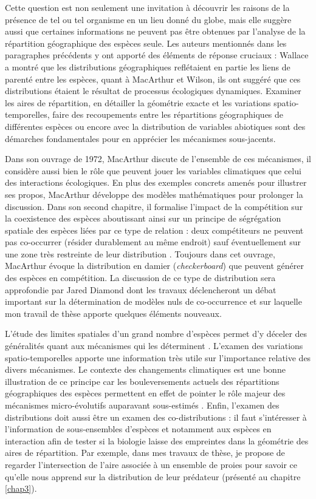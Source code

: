 Cette question est non seulement une invitation à découvrir les raisons
de la présence de tel ou tel organisme en un lieu donné du globe, mais
elle suggère aussi que certaines informations ne peuvent pas être
obtenues par l'analyse de la répartition géographique des espèces seule.
Les auteurs mentionnés dans les paragraphes précédents y ont apporté des
éléments de réponse cruciaux : Wallace a montré que les distributions
géographiques reflétaient en partie les liens de parenté entre les
espèces, quant à MacArthur et Wilson, ils ont suggéré que ces
distributions étaient le résultat de processus écologiques dynamiques.
Examiner les aires de répartition, en détailler la géométrie exacte et
les variations spatio-temporelles, faire des recoupements entre les
répartitions géographiques de différentes espèces ou encore avec la
distribution de variables abiotiques sont des démarches fondamentales
pour en apprécier les mécanismes sous-jacents.

Dans son ouvrage de 1972, MacArthur discute de l'ensemble de ces
mécanismes, il considère aussi bien le rôle que peuvent jouer les
variables climatiques que celui des interactions écologiques. En plus
des exemples concrets amenés pour illustrer ses propos, MacArthur
développe des modèles mathématiques pour prolonger la discussion. Dans
son second chapitre, il formalise l'impact de la compétition sur la
coexistence des espèces aboutissant ainsi sur un principe de ségrégation
spatiale des espèces liées par ce type de relation : deux compétiteurs
ne peuvent pas co-occurrer (résider durablement au même endroit) sauf
éventuellement sur une zone très restreinte de leur distribution
\citep{macarthur1972geographical}. Toujours dans cet ouvrage, MacArthur
évoque la distribution en damier (\emph{checkerboard}) que peuvent
générer des espèces en compétition. La discussion de ce type de
distribution sera approfondie par Jared Diamond \citep{Diamond1975} dont
les travaux déclencheront un débat important sur la détermination de
modèles nuls de co-occurrence \citep{Connor1979} et sur laquelle mon
travail de thèse apporte quelques éléments nouveaux.

L'étude des limites spatiales d'un grand nombre d'espèces permet d'y
déceler des généralités quant aux mécanismes qui les déterminent
\citep{macarthur1972geographical}. L'examen des variations
spatio-temporelles apporte une information très utile sur l'importance
relative des divers mécanismes. Le contexte des changements climatiques
est une bonne illustration de ce principe car les bouleversements
actuels des répartitions géographiques des espèces permettent en effet
de pointer le rôle majeur des mécanismes micro-évolutifs auparavant
sous-estimés \citep{Lavergne2010}. Enfin, l'examen des distributions
doit aussi être un examen des co-distributions : il faut s'intéresser à
l'information de sous-ensembles d'espèces et notamment aux espèces en
interaction afin de tester si la biologie laisse des empreintes dans la
géométrie des aires de répartition. Par exemple, dans mes travaux de
thèse, je propose de regarder l'intersection de l'aire associée à un
ensemble de proies pour savoir ce qu'elle nous apprend sur la
distribution de leur prédateur (présenté au chapitre \ref{chap3}).

